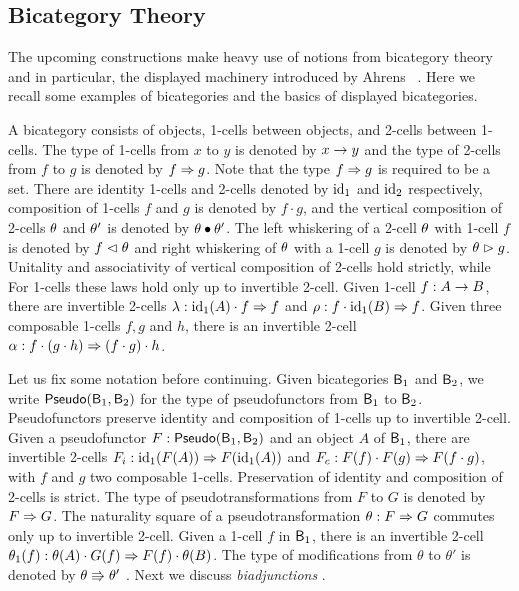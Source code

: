 \subsection{Bicategory Theory}
The upcoming constructions make heavy use of notions from bicategory theory \cite{10.1007/BFb0074299,leinster:basic-bicats}
and in particular, the displayed machinery introduced by Ahrens \etal \ \cite{bicatjournal}.
Here we recall some examples of bicategories and the basics of displayed bicategories.

A bicategory consists of objects, 1-cells between objects, and 2-cells between 1-cells.
The type of 1-cells from $x$ to $y$ is denoted by $x \onecell y$ and the type of 2-cells from $f$ to $g$ is denoted by $f \twocell g$.
Note that the type $f \twocell g$ is required to be a set.
There are identity 1-cells and 2-cells denoted by $\id_1$ and $\id_2$ respectively, composition of 1-cells $f$ and $g$ is denoted by $f \cdot g$,
and the vertical composition of 2-cells $\tc$ and $\tc'$ is denoted by $\tc \vcomp \tc'$.
The left whiskering of a 2-cell $\tc$ with 1-cell $f$ is denoted by $f \whiskerl \tc$ and right whiskering of $\tc$ with a 1-cell $g$ is denoted by $\tc \whiskerr g$. 
Unitality and associativity of vertical composition of 2-cells hold strictly, while For 1-cells these laws hold only up to invertible 2-cell. Given 1-cell $f : A \onecell B$, there are invertible 2-cells $\lunitor{f} : \id_1(A) \cdot f \twocell f$ and $\runitor{f} : f \cdot \id_1(B) \twocell f$.
Given three composable 1-cells $f,g$ and $h$, there is an invertible 2-cell $\lassoc{f}{g}{h} : f \cdot (g \cdot h) \twocell (f \cdot g) \cdot h$.

Let us fix some notation before continuing.  Given bicategories $\B_1$
and $\B_2$, we write $\pseudo(\B_1, \B_2)$ for the type of
pseudofunctors from $\B_1$ to $\B_2$. Pseudofunctors preserve identity
and composition of 1-cells up to invertible 2-cell. Given a
pseudofunctor $F : \pseudo(\B_1, \B_2)$ and an object $A$ of $\B_1$,
there are invertible 2-cells $\identitor{F} :\id_1(F(A)) \twocell
F(\id_1(A))$ and $\compositor{F} : F(f) \cdot F(g) \twocell F(f \cdot
g)$, with $f$ and $g$ two composable 1-cells. Preservation of identity
and composition of 2-cells is strict.
The type of pseudotransformations from $F$ to $G$ is denoted by
$\pstrans{F}{G}$.
The naturality square of a pseudotransformation $\theta : \pstrans{F}{G}$ commutes only up to invertible 2-cell. Given a 1-cell $f$ in $\B_1$, there is an invertible 2-cell $\theta_1(f) : \theta(A) \cdot G(f) \twocell F(f) \cdot \theta(B)$.
The type of modifications from $\theta$ to
$\theta'$ is denoted by $\modif{\theta}{\theta'}$
\cite{leinster:basic-bicats}.  Next we discuss \emph {biadjunctions}
\cite{gurski2012biequivalences,LACK2000179}.

